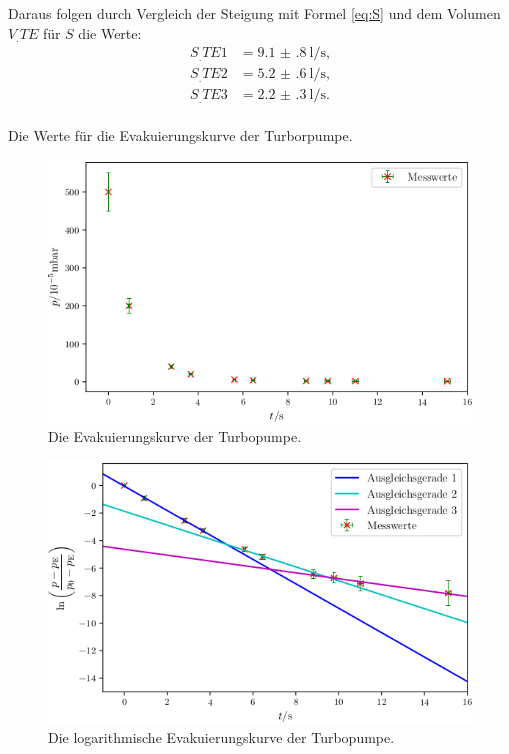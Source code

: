 Daraus folgen durch Vergleich der Steigung mit Formel \eqref{eq:S} und dem Volumen $V_.{TE}$ für $S$ die Werte:
\begin{align*}
S_.{TE1} &= \SI{9.1(8)}{\litre\per\second} \text{,}\\
S_.{TE2} &= \SI{5.2(6)}{\litre\per\second} \text{,}\\
S_.{TE3} &= \SI{2.2(3)}{\litre\per\second} \text{.}\\
\end{align*} 

\begin{table}
\centering
\caption{Die Werte für die Evakuierungskurve der Turborpumpe.}

\label{tab:TS}
\end{table}

\begin{figure}
\centering
\includegraphics[width=\linewidth-70pt,height=\textheight-70pt,keepaspectratio]{content/images/TSE.png}
\caption{Die Evakuierungskurve der Turbopumpe.}
\label{fig:TSE}
\end{figure}

\begin{figure}
\centering
\includegraphics[width=\linewidth-70pt,height=\textheight-70pt,keepaspectratio]{content/images/TSL.png}
\caption{Die logarithmische Evakuierungskurve der Turbopumpe.}
\label{fig:TSL}
\end{figure}

